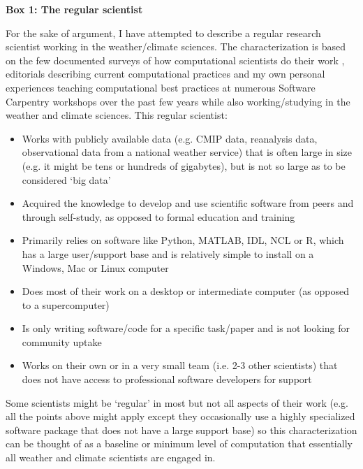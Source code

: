 \textbf{Box 1: The regular scientist}

For the sake of argument, I have attempted to describe a regular research scientist working in the weather/climate sciences. The characterization is based on the few documented surveys of how computational scientists do their work \citep{Hannay2009,Stodden2010}, editorials describing current computational practices \citep[e.g.][]{Easterbrook2014} and my own personal experiences teaching computational best practices at numerous Software Carpentry \citep{Wilson2014} workshops over the past few years while also working/studying in the weather and climate sciences. This regular scientist:
\begin{itemize}
\item Works with publicly available data (e.g. CMIP data, reanalysis data, observational data from a national weather service) that is often large in size (e.g. it might be tens or hundreds of gigabytes), but is not so large as to be considered `big data' 
\item Acquired the knowledge to develop and use scientific software from peers and through self-study, as opposed to formal education and training
\item Primarily relies on software like Python, MATLAB, IDL, NCL or R, which has a large user/support base and is relatively simple to install on a Windows, Mac or Linux computer
\item Does most of their work on a desktop or intermediate computer (as opposed to a supercomputer)
\item Is only writing software/code for a specific task/paper and is not looking for community uptake  
\item Works on their own or in a very small team (i.e. 2-3 other scientists) that does not have access to professional software developers for support
\end{itemize}

Some scientists might be `regular' in most but not all aspects of their work (e.g. all the points above might apply except they occasionally use a highly specialized software package that does not have a large support base) so this characterization can be thought of as a baseline or minimum level of computation that essentially all weather and climate scientists are engaged in.  
